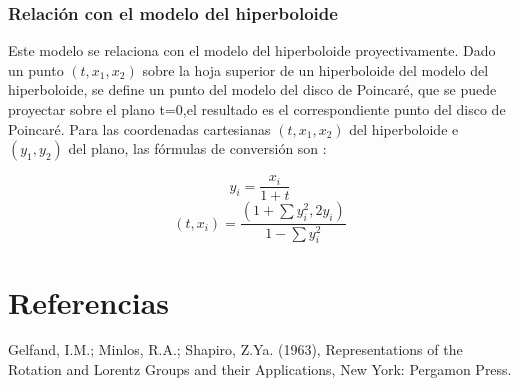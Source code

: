 \documentclass{article}
\theoremstyle{plain}
\theoremstyle{definition}
\theoremstyle{remark}
\begin{document}
\subsubsection{Relación con el modelo del hiperboloide}
Este modelo se relaciona con el modelo del hiperboloide
proyectivamente. Dado un punto $(t, x_1,x_2)$ sobre la hoja superior
de un hiperboloide del modelo del hiperboloide, se define un punto del
modelo del disco de Poincaré, que se puede proyectar sobre el plano
t=0,el resultado es el correspondiente punto del disco de Poincaré.
Para las coordenadas cartesianas $(t,x_1,x_2)$ del hiperboloide e
$(y_1,y_2)$ del plano, las fórmulas de conversión son :

$$y_{i}=\frac {x_{i}}{1+t}$$
$$(t,x_{i})=\frac {(1+\sum {y_{i}^{2}},2y_{i})}{1-\sum {y_{i}^{2}}}$$


\section{Referencias}
\begin{thebibliography}{9}

  Gelfand, I.M.; Minlos, R.A.; Shapiro, Z.Ya. (1963),
  Representations of the Rotation and Lorentz Groups and their Applications,
  New York: Pergamon Press.


\end{thebibliography}
\end{document}
